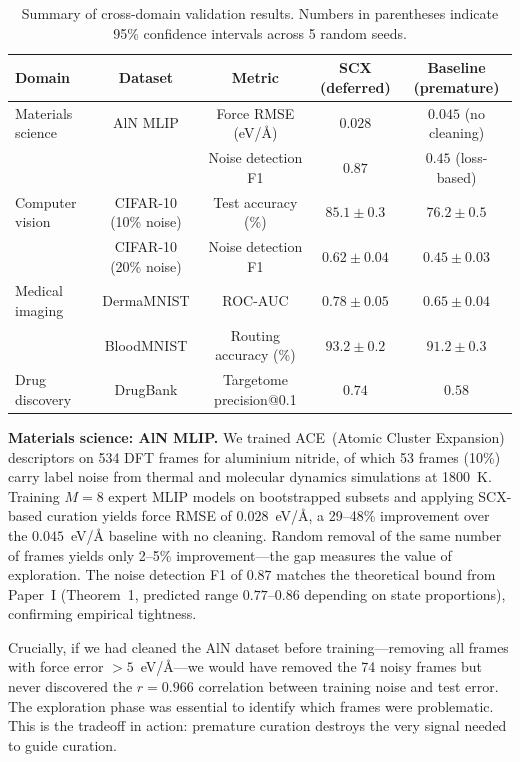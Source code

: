 \documentclass[12pt,a4paper]{article}
\begin{document}
\begin{table}
\centering
\caption{Summary of cross-domain validation results. Numbers in parentheses indicate 95\% confidence intervals across 5 random seeds.}
\label{tab:summary}
\begin{tabular}{lcccc}
\hline
Domain & Dataset & Metric & SCX (deferred) & Baseline (premature) \\
\hline
Materials science & AlN MLIP & Force RMSE (eV/{\AA}) & $0.028$ & $0.045$ (no cleaning) \\
 & & Noise detection F1 & $0.87$ & $0.45$ (loss-based) \\
Computer vision & CIFAR-10 (10\% noise) & Test accuracy (\%) & $85.1 \pm 0.3$ & $76.2 \pm 0.5$ \\
 & CIFAR-10 (20\% noise) & Noise detection F1 & $0.62 \pm 0.04$ & $0.45 \pm 0.03$ \\
Medical imaging & DermaMNIST & ROC-AUC & $0.78 \pm 0.05$ & $0.65 \pm 0.04$ \\
 & BloodMNIST & Routing accuracy (\%) & $93.2 \pm 0.2$ & $91.2 \pm 0.3$ \\
Drug discovery & DrugBank & Targetome precision@0.1 & $0.74$ & $0.58$ \\
\hline
\end{tabular}
\end{table}

\textbf{Materials science: AlN MLIP.} We trained ACE~(Atomic Cluster Expansion) descriptors on 534 DFT frames for aluminium nitride, of which 53 frames (10\%) carry label noise from thermal and molecular dynamics simulations at 1800~K. Training $M=8$ expert MLIP models on bootstrapped subsets and applying SCX-based curation yields force RMSE of $0.028$~eV/{\AA}, a 29--48\% improvement over the $0.045$~eV/{\AA} baseline with no cleaning. Random removal of the same number of frames yields only 2--5\% improvement---the gap measures the value of exploration. The noise detection F1 of $0.87$ matches the theoretical bound from Paper~I (Theorem~1, predicted range $0.77$--$0.86$ depending on state proportions), confirming empirical tightness.

Crucially, if we had cleaned the AlN dataset before training---removing all frames with force error $> 5$~eV/{\AA}---we would have removed the 74 noisy frames but never discovered the $r=0.966$ correlation between training noise and test error. The exploration phase was essential to identify which frames were problematic. This is the tradeoff in action: premature curation destroys the very signal needed to guide curation.
\end{document}
